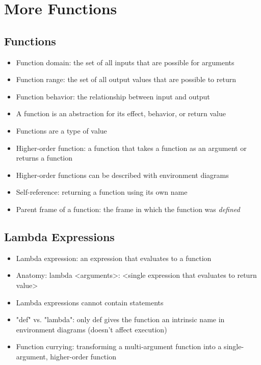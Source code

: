 \chapter{More Functions}

\section{Functions}
\begin{itemize}
    \item Function domain: the set of all inputs that are possible for arguments
    \item Function range: the set of all output values that are possible to return
    \item Function behavior: the relationship between input and output
    \item A function is an abstraction for its effect, behavior, or return value
    \item Functions are a type of value
    \item Higher-order function: a function that takes a function as an argument or returns a function
    \item Higher-order functions can be described with environment diagrams
    \item Self-reference: returning a function using its own name
    \item Parent frame of a function: the frame in which the function was \emph{defined}
\end{itemize}

\section{Lambda Expressions}
\begin{itemize}
    \item Lambda expression: an expression that evaluates to a function
    \item Anatomy: lambda <arguments>: <single expression that evaluates to return value>
    \item Lambda expressions cannot contain statements
    \item "def" vs. "lambda": only def gives the function an intrinsic name in environment diagrams (doesn't affect execution)
    \item Function currying: transforming a multi-argument function into a single-argument, higher-order function
\end{itemize}    

